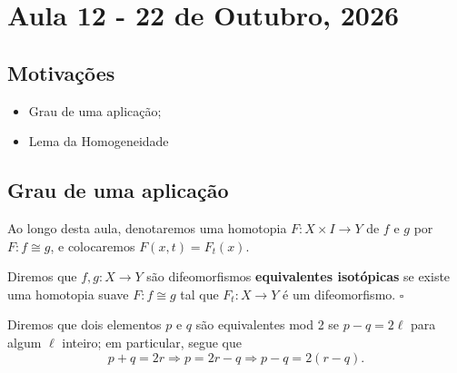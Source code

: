 \documentclass[../differential_topology.tex]{subfiles}
\begin{document}
\section{Aula 12 - 22 de Outubro, 2026}
\subsection{Motivações}
\begin{itemize}
	\item Grau de uma aplicação;
	\item Lema da Homogeneidade
\end{itemize}
\subsection{Grau de uma aplicação}
Ao longo desta aula, denotaremos uma homotopia \(F:X\times I\rightarrow Y\) de \(f\) e \(g\) por \(F:f\cong g\), e colocaremos \(F(x, t) = F_{t}(x)\).
\begin{def*}
	Diremos que \(f, g:X\rightarrow Y\) são difeomorfismos \textbf{equivalentes isotópicas} se existe uma homotopia suave \(F:f\cong g\) tal que \(F_{t}:X\rightarrow Y\) é um difeomorfismo. \(\square\)
\end{def*}

\begin{tcolorbox}[
		skin=enhanced,
		title=Lembrete!,
		after title={\hfill Resto de divisão por 2},
		fonttitle=\bfseries,
		sharp corners=downhill,
		colframe=black,
		colbacktitle=yellow!75!white,
		colback=yellow!30,
		colbacklower=black,
		coltitle=black,
		drop large lifted shadow
	]
	Diremos que dois elementos \(p\) e \(q\) são equivalentes mod 2 se \(p-q=2\ell \) para algum \(\ell \) inteiro; em particular, segue que
	\[
		p + q = 2r \Rightarrow p = 2r-q \Rightarrow p - q = 2(r-q).
	\]
\end{tcolorbox}
\end{document}
